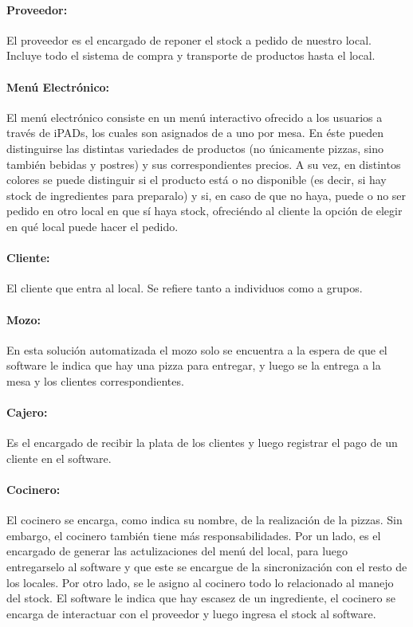 \documentclass[a4paper,10pt]{article}
\begin{document}
\paragraph{Proveedor:}
El proveedor es el encargado de reponer el stock a pedido de nuestro local. Incluye todo el sistema de compra y transporte de productos hasta el local.
\\
\paragraph{Menú Electrónico:}
El menú electrónico consiste en un menú interactivo ofrecido a los usuarios a través de iPADs, los cuales son asignados de a uno por mesa. En éste pueden distinguirse las distintas variedades de productos (no únicamente pizzas, sino también bebidas y postres) y sus correspondientes precios. A su vez, en distintos colores se puede distinguir si el producto está o no disponible (es decir, si hay stock de ingredientes para preparalo) y si, en caso de que no haya, puede o no ser pedido en otro local en que sí haya stock, ofreciéndo al cliente la opción de elegir en qué local puede hacer el pedido.
\\
\paragraph{Cliente:}
El cliente que entra al local. Se refiere tanto a individuos como a grupos.
\\
\paragraph{Mozo:}
En esta soluci\'on automatizada el mozo solo se encuentra a la espera de que el software le indica que hay una pizza para entregar, y luego se la entrega a la mesa y los clientes correspondientes.
\\
\paragraph{Cajero:}
Es el encargado de recibir la plata de los clientes y luego registrar el pago de un cliente en el software.
\\
\paragraph{Cocinero:}
El cocinero se encarga, como indica su nombre, de la realizaci\'on de la pizzas. Sin embargo, el cocinero tambi\'en tiene m\'as responsabilidades. Por un lado, es el encargado de generar las actulizaciones del men\'u del local, para luego entregarselo al software y que este se encargue de la sincronizaci\'on con el resto de los locales. Por otro lado, se le asigno al cocinero todo lo relacionado al manejo del stock. El software le indica que hay escasez de un ingrediente, el cocinero se encarga de interactuar con el proveedor y luego ingresa el stock al software. 
\end{document}
